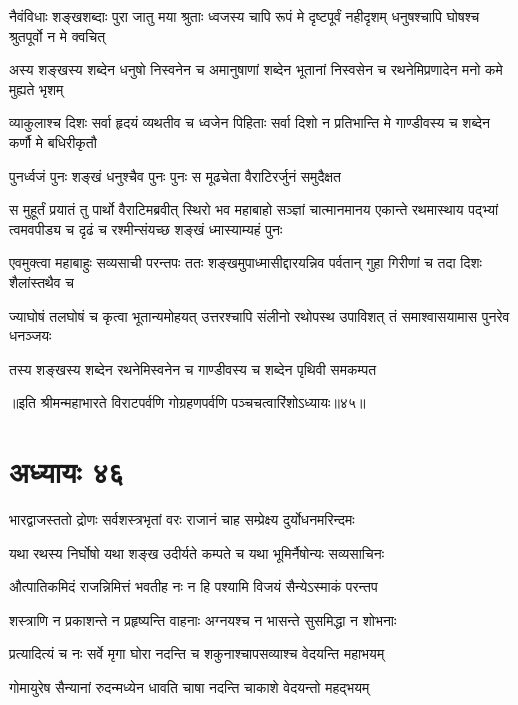 \threelineshloka
{नैवंविधाः शङ्खशब्दाः पुरा जातु मया श्रुताः}
{ध्वजस्य चापि रूपं मे दृष्टपूर्वं नहीदृशम्}
{धनुषश्चापि घोषश्च श्रुतपूर्वो न मे क्वचित्}


\threelineshloka
{अस्य शङ्खस्य शब्देन धनुषो निस्वनेन च}
{अमानुषाणां शब्देन भूतानां निस्वसेन च}
{रथनेमिप्रणादेन मनो कमे मुह्यते भृशम्}


\threelineshloka
{व्याकुलाश्च दिशः सर्वा हृदयं व्यथतीव च}
{ध्वजेन पिहिताः सर्वा दिशो न प्रतिभान्ति मे}
{गाण्डीवस्य च शब्देन कर्णौ मे बधिरीकृतौ}



\twolineshloka
{पुनर्ध्वजं पुनः शङ्खं धनुश्चैव पुनः पुनः}
{स मूढचेता वैराटिरर्जुनं समुदैक्षत}


\onelineshloka
{स मुहूर्तं प्रयातं तु पार्थो वैराटिमब्रवीत्}
\threelineshloka
{स्थिरो भव महाबाहो सञ्ज्ञां चात्मानमानय}
{एकान्ते रथमास्थाय पद्भ्यां त्वमवपीड्य च}
{दृढं च रश्मीन्संयच्छ शङ्खं ध्मास्याम्यहं पुनः}


\threelineshloka
{एवमुक्त्वा महाबाहुः सव्यसाची परन्तपः}
{ततः शङ्खमुपाध्मासीद्दारयन्निव पर्वतान्}
{गुहा गिरीणां च तदा दिशः शैलांस्तथैव च}


\threelineshloka
{ज्याघोषं तलघोषं च कृत्वा भूतान्यमोहयत्}
{उत्तरश्चापि संलीनो रथोपस्थ उपाविशत्}
{तं समाश्वासयामास पुनरेव धनञ्जयः}


\twolineshloka
{तस्य शङ्खस्य शब्देन रथनेमिस्वनेन च}
{गाण्डीवस्य च शब्देन पृथिवी समकम्पत}

॥इति श्रीमन्महाभारते विराटपर्वणि गोग्रहणपर्वणि पञ्चचत्वारिंशोऽध्यायः॥४५॥

\chapter{अध्यायः ४६}

\twolineshloka
{भारद्वाजस्ततो द्रोणः सर्वशस्त्रभृतां वरः}
{राजानं चाह सम्प्रेक्ष्य दुर्योधनमरिन्दमः}


\twolineshloka
{यथा रथस्य निर्घोषो यथा शङ्ख उदीर्यते}
{कम्पते च यथा भूमिर्नैषोन्यः सव्यसाचिनः}


\twolineshloka
{औत्पातिकमिदं राजन्निमित्तं भवतीह नः}
{न हि पश्यामि विजयं सैन्येऽस्माकं परन्तप}


\twolineshloka
{शस्त्राणि न प्रकाशन्ते न प्रहृष्यन्ति वाहनाः}
{अग्नयश्च न भासन्ते सुसमिद्धा न शोभनाः}


\twolineshloka
{प्रत्यादित्यं च नः सर्वे मृगा घोरा नदन्ति च}
{शकुनाश्चापसव्याश्च वेदयन्ति महाभयम्}


\twolineshloka
{गोमायुरेष सैन्यानां रुदन्मध्येन धावति}
{चाषा नदन्ति चाकाशे वेदयन्तो महद्भयम्}


